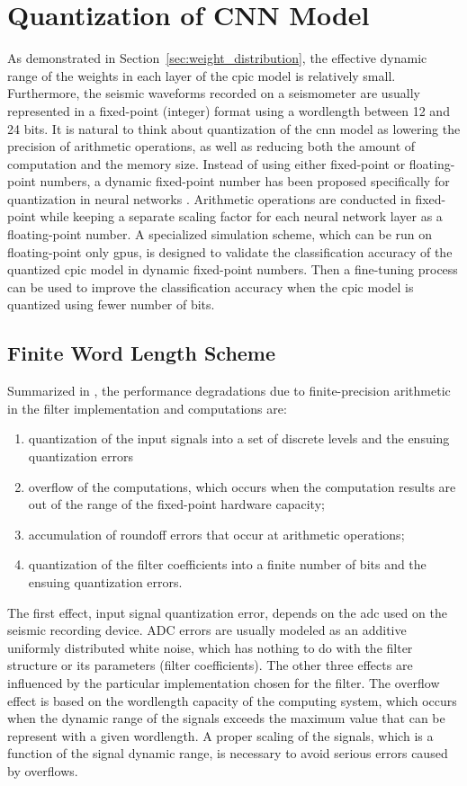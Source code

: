 \documentclass{article}
\begin{document}
\section{Quantization of CNN Model}
\label{sec:quantization}
%
As demonstrated in Section~\ref{sec:weight_distribution}, the effective dynamic range of the weights in each layer of the \gls{cpic} model is relatively small.
Furthermore, the seismic waveforms recorded on a seismometer are usually represented in a fixed-point (integer) format using a wordlength between 12 and 24 bits.
It is natural to think about quantization of the \gls{cnn} model as lowering the precision of arithmetic operations, as well as reducing both the amount of computation and the memory size.
Instead of using either fixed-point or floating-point numbers, a dynamic fixed-point number has been proposed specifically for quantization in neural networks \autocite{courbariaux2014training}.
Arithmetic operations are conducted in fixed-point while keeping a separate scaling factor for each neural network layer as a floating-point number.
A specialized simulation scheme, which can be run on floating-point only \glspl{gpu}, is designed to validate the classification accuracy of the quantized \gls{cpic} model in dynamic fixed-point numbers.
Then a fine-tuning process can be used to improve the classification accuracy when the \gls{cpic} model is quantized using fewer number of bits.


\subsection{Finite Word Length Scheme}
\label{sec:finite_word_length}
%
Summarized in \textcite{gevers1993finite}, the performance degradations due to finite-precision arithmetic in the filter implementation and computations are:
%
\begin{enumerate}
    \item  quantization of the input signals into a set of discrete levels and the ensuing quantization errors
    \item overflow of the computations, which occurs when the computation results are out of the range of the fixed-point hardware capacity;
    \item accumulation of roundoff errors that occur at arithmetic operations;
    \item quantization of the filter coefficients into a  finite number of bits and the ensuing quantization errors.
\end{enumerate}
%
The first effect, input signal quantization error, depends on the \gls{adc} used on the seismic recording device.
ADC errors are usually modeled as an additive uniformly distributed white noise, which has nothing to do with the filter structure or its parameters (filter coefficients).
The other three effects are influenced by the particular implementation chosen for the filter.
The overflow effect is based on the wordlength capacity of the computing system, which occurs when the dynamic range of the signals exceeds the maximum value that can be represent with a given wordlength.
A proper scaling of the signals, which is a function of the signal dynamic range, is necessary to avoid serious errors caused by overflows.
\end{document}
